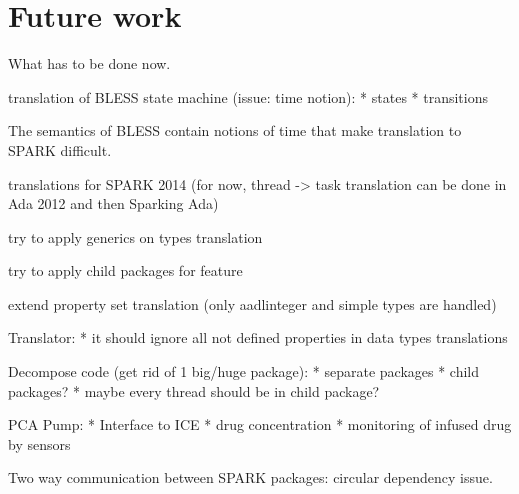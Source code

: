 
\cleardoublepage

\chapter{Future work}
\label{future_work}

What has to be done now.

translation of BLESS state machine (issue: time notion):
	* states
	* transitions

The semantics of BLESS contain notions of time that make translation to SPARK difficult.

translations for SPARK 2014 (for now, thread -> task translation can be done in Ada 2012 and then Sparking Ada)

try to apply generics on types translation

try to apply child packages for feature 

extend property set translation (only aadlinteger and simple types are handled)

Translator:
* it should ignore all not defined properties in data types translations

Decompose code (get rid of 1 big/huge package):
* separate packages
* child packages?
* maybe every thread should be in child package?

PCA Pump:
* Interface to ICE
* drug concentration
* monitoring of infused drug by sensors

Two way communication between SPARK packages: circular dependency issue.